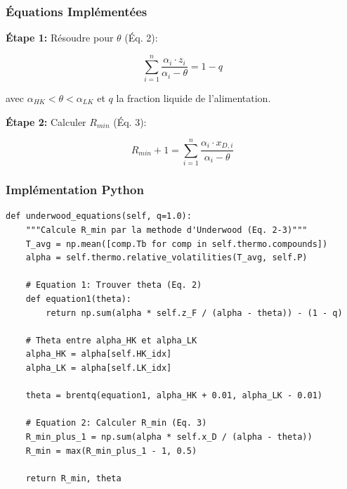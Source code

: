 \documentclass[11pt,a4paper]{article}
\begin{document}
\subsubsection{Équations Implémentées}

\textbf{Étape 1:} Résoudre pour $\theta$ (Éq. 2):

\begin{tcolorbox}[colback=yellow!10,colframe=orange!50!black,title=Équation 2: Underwood - Theta]
\begin{equation}
\sum_{i=1}^{n} \frac{\alpha_i \cdot z_i}{\alpha_i - \theta} = 1 - q
\end{equation}
\end{tcolorbox}

avec $\alpha_{HK} < \theta < \alpha_{LK}$ et $q$ la fraction liquide de l'alimentation.

\textbf{Étape 2:} Calculer $R_{min}$ (Éq. 3):

\begin{tcolorbox}[colback=yellow!10,colframe=orange!50!black,title=Équation 3: Underwood - R\_min]
\begin{equation}
R_{min} + 1 = \sum_{i=1}^{n} \frac{\alpha_i \cdot x_{D,i}}{\alpha_i - \theta}
\end{equation}
\end{tcolorbox}

\subsubsection{Implémentation Python}

\begin{lstlisting}[caption=Méthode d'Underwood dans distillation\_multicomposants.py]
def underwood_equations(self, q=1.0):
    """Calcule R_min par la methode d'Underwood (Eq. 2-3)"""
    T_avg = np.mean([comp.Tb for comp in self.thermo.compounds])
    alpha = self.thermo.relative_volatilities(T_avg, self.P)

    # Equation 1: Trouver theta (Eq. 2)
    def equation1(theta):
        return np.sum(alpha * self.z_F / (alpha - theta)) - (1 - q)

    # Theta entre alpha_HK et alpha_LK
    alpha_HK = alpha[self.HK_idx]
    alpha_LK = alpha[self.LK_idx]

    theta = brentq(equation1, alpha_HK + 0.01, alpha_LK - 0.01)

    # Equation 2: Calculer R_min (Eq. 3)
    R_min_plus_1 = np.sum(alpha * self.x_D / (alpha - theta))
    R_min = max(R_min_plus_1 - 1, 0.5)

    return R_min, theta
\end{lstlisting}
\end{document}
